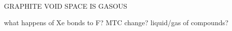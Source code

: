 GRAPHITE VOID SPACE IS GASOUS

what happens of Xe bonds to F?  MTC change?  liquid/gas of compounds?